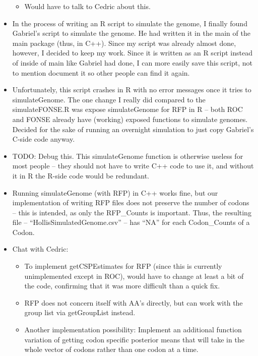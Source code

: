 \documentclass[12pt,hyperref]{labbook}
\begin{document}
\begin{itemize}
\begin{itemize}
        \item Would have to talk to Cedric about this.
    \end{itemize}
    \item In the process of writing an R script to simulate the genome, I finally found Gabriel's script to simulate the genome.
    He had written it in the main of the main package (thus, in C++).
    Since my script was already almost done, however, I decided to keep my work.
    Since it is written as an R script instead of inside of main like Gabriel had done, I can more easily save this script, not to mention document it so other people can find it again.
    \item Unfortunately, this script crashes in R with no error messages once it tries to simulateGenome.
    The one change I really did compared to the simulateFONSE.R was expose simulateGenome for RFP in R -- both ROC and FONSE already have (working) exposed functions to simulate genomes.
    Decided for the sake of running an overnight simulation to just copy Gabriel's C-side code anyway.
    \item TODO: Debug this. 
    This simulateGenome function is otherwise useless for most people -- they should not have to write C++ code to use it, and without it in R the R-side code would be redundant.
    
    \item Running simulateGenome (with RFP) in C++ works fine, but our implementation of writing RFP files does not preserve the number of codons -- this is intended, as only the RFP\_Counts is important.
    Thus, the resulting file -- \enquote{HollisSimulatedGenome.csv} -- has \enquote{NA} for each Codon\_Counts of a Codon.
    \item Chat with Cedric:
    \begin{itemize}
        \item To implement getCSPEstimates for RFP (since this is currently unimplemented except in ROC), would have to change at least a bit of the code, confirming that it was more difficult than a quick fix.
        \item RFP does not concern itself with AA's directly, but can work with the group list via getGroupList instead.
        \item Another implementation possibility: Implement an additional function variation of getting codon specific posterior means that will take in the whole vector of codons rather than one codon at a time.

\end{itemize}
\end{itemize}
\end{document}
